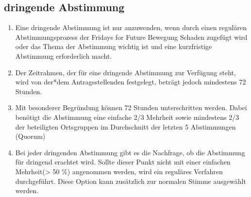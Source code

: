 \documentclass[a4paper,
  ]{scrartcl}
\begin{document}
\subsection{dringende Abstimmung}
\begin{enumerate}
      \item Eine dringende Abstimmung ist nur anzuwenden, wenn durch einen regulären
            Abstimmungsprozess der Fridays for Future Bewegung Schaden zugefügt wird oder das Thema der
            Abstimmung wichtig ist und eine kurzfristige Abstimmung erforderlich macht.
      \item Der Zeitrahmen, der für eine dringende Abstimmung zur Verfügung steht, wird von
            der*dem Antragsstellenden festgelegt, beträgt jedoch mindestens 72 Stunden.
      \item Mit besonderer Begründung können 72 Stunden unterschritten werden. Dabei
            benötigt die Abstimmung eine einfache 2/3 Mehrheit sowie mindestens 2/3 der
            beteiligten Ortsgruppen im Durchschnitt der letzten 5 Abstimmungen (Quorum)
      \item Bei jeder dringenden Abstimmung gibt es die Nachfrage, ob die Abstimmung für
            dringend erachtet wird. Sollte dieser Punkt nicht mit
            einer einfachen Mehrheit(> 50 \%) angenommen werden, wird ein reguläres Verfahren
            durchgeführt. Diese Option kann zusätzlich zur normalen Stimme ausgewählt werden.
\end{enumerate}
\end{document}

